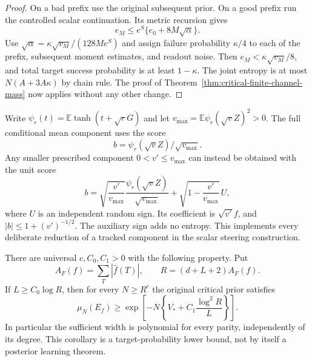 \begin{proof}
On a bad prefix use the original subsequent prior.  On a good prefix
run the controlled scalar continuation.  Its metric recursion gives
\[
 e_M\le e^S\{e_0+8M\sqrt\alpha\}.
\]
Use $\sqrt\alpha=\kappa\sqrt{v_M}/(128Me^S)$ and assign failure
probability $\kappa/4$ to each of the prefix, subsequent moment
estimates, and readout noise.  Then $e_M<\kappa\sqrt{v_M}/8$,
and total target success probability is at least $1-\kappa$.
The joint entropy is at most $N(A+3A\kappa)$ by chain rule.
The proof of Theorem~\ref{thm:critical-finite-channel-mass} now
applies without any other change.
\end{proof}

\begin{remark}
\label{rem:critical-channel-reduction}
Write $\psi_r(t)=\mathbb E\tanh(t+\sqrt rG)$ and let
$v_{\max}=\mathbb E\psi_r(\sqrt vZ)^2>0$.  The full conditional
mean component uses the score
\[
 b=\psi_r(\sqrt vZ)/\sqrt{v_{\max}}.
\]
Any smaller prescribed component $0<v'\le v_{\max}$ can instead
be obtained with the unit score
\[
 b=\sqrt{\frac{v'}{v_{\max}}}
       \frac{\psi_r(\sqrt vZ)}{\sqrt{v_{\max}}}
       +\sqrt{1-\frac{v'}{v_{\max}}}\,U,
\]
where $U$ is an independent random sign.  Its coefficient is
$\sqrt{v'}f$, and $|b|\le1+(v')^{-1/2}$.  The auxiliary sign adds
no entropy.  This implements every deliberate reduction of a tracked
component in the scalar steering construction.
\end{remark}

\begin{corollary}
\label{cor:critical-finite-fourier-mass}
There are universal $c,C_0,C_1>0$ with the following property.  Put
\[
 A_F(f)=\sum_T|\widehat f(T)|,\qquad
 R=(d+L+2)A_F(f).
\]
If $L\ge C_0\log R$, then for every $N\ge R^c$ the original
critical prior satisfies
\[
 \mu_N(E_f)\ge
 \exp\left[-N\left\{V_*+C_1\frac{\log^2R}{L}\right\}\right].
\]
In particular the sufficient width is polynomial for every parity,
independently of its degree.  This corollary is a target-probability
lower bound, not by itself a posterior learning theorem.
\end{corollary}

